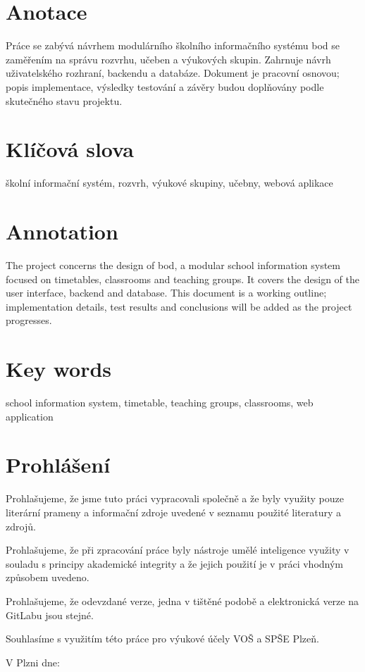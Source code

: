 
\MakeTitlePage
{}
\setcounter{page}{2}



\section*{Anotace}
Práce se zabývá návrhem modulárního školního informačního systému bod se
zaměřením na správu rozvrhu, učeben a výukových skupin. Zahrnuje návrh
uživatelského rozhraní, backendu a databáze. Dokument je pracovní osnovou; popis implementace,
výsledky testování a závěry budou doplňovány podle skutečného stavu projektu.

\section*{Klíčová slova}
školní informační systém, rozvrh, výukové skupiny, učebny, webová aplikace

\section*{Annotation}
The project concerns the design of bod, a modular school information system
focused on timetables, classrooms and teaching groups. It covers the design
of the user interface, backend and database. This document is a working outline;
implementation details, test results and conclusions will be added as the
project progresses.

\section*{Key words}
school information system, timetable, teaching groups, classrooms, web application

\newpage
\section*{Prohlášení}
\begin{citacePlain}
Prohlašujeme, že jsme tuto práci vypracovali společně a že byly využity pouze
literární prameny a informační zdroje uvedené v seznamu použité literatury a zdrojů.

Prohlašujeme, že při zpracování práce byly nástroje umělé inteligence využity
v souladu s principy akademické integrity a že jejich použití je v práci
vhodným způsobem uvedeno.

Prohlašujeme, že odevzdané verze, jedna v tištěné podobě a elektronická verze
na GitLabu jsou stejné.

Souhlasíme s využitím této práce pro výukové účely VOŠ a SPŠE Plzeň.
\end{citacePlain}
\vspace{1cm}
\noindent V Plzni dne: \dotfill
\vspace{1cm}

